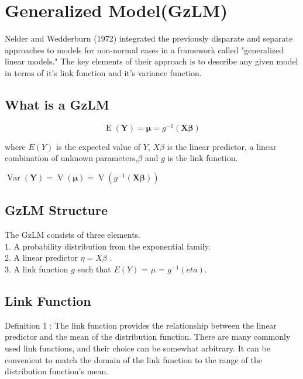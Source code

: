 \documentclass[Main.tex]{subfiles}
\begin{document}
	\section{Generalized  Model(GzLM)}
	
	Nelder and Wedderburn (1972) integrated the previously disparate
	and separate approaches to models for non-normal cases in a
	framework called "generalized linear models."  The key elements of
	their approach is to describe any given model in terms of it's
	link function and it's variance function.
	
	\subsection{What is a GzLM}
	
	\begin{equation}
	\operatorname{E}(\mathbf{Y}) = \boldsymbol{\mu} =
	g^{-1}(\mathbf{X}\boldsymbol{\beta})
	\end{equation}
	
	where $E(Y)$ is the expected value of $Y$, $X\beta$ is the linear
	predictor, a linear combination of unknown parameters,$\beta$ and
	$g$ is the link function.
	
	
	$\operatorname{Var}(\mathbf{Y}) = \operatorname{V}(
	\boldsymbol{\mu} ) =
	\operatorname{V}(g^{-1}(\mathbf{X}\boldsymbol{\beta}))$
	\\
	
	
	\subsection{GzLM Structure}
	The GzLM consists of three elements. \\1. A probability
	distribution from the exponential family. \\2. A linear predictor
	$\eta= X\beta$ . \\3. A link function $g$ such that $E(Y)$ = $\mu$
	= $g^{-1}(eta)$.
	
	\subsection{Link Function}
	Definition 1 : The link function provides the relationship between
	the linear predictor and the mean of the distribution function.
	There are many commonly used link functions, and their choice can
	be somewhat arbitrary. It can be convenient to match the domain of
	the link function to the range of the distribution function's
	mean.
	
\end{document}
